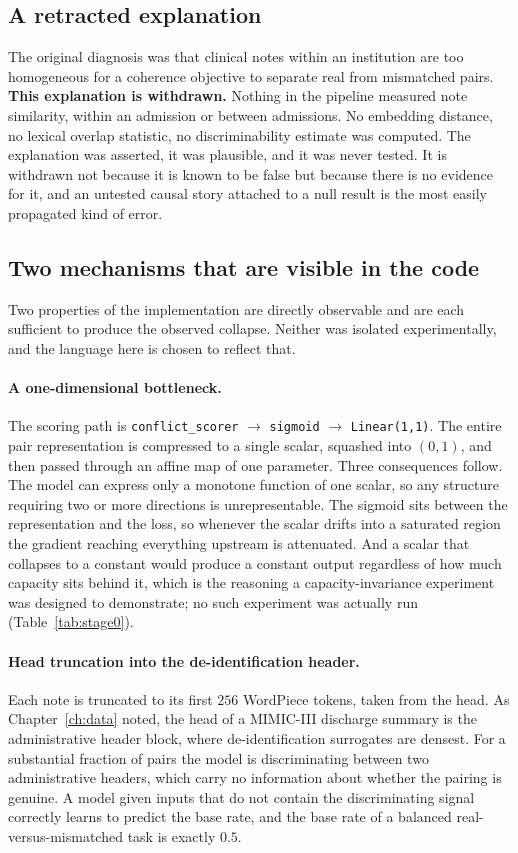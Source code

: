 \subsection{A retracted explanation}

The original diagnosis was that clinical notes within an institution are too
homogeneous for a coherence objective to separate real from mismatched pairs.
\textbf{This explanation is withdrawn.} Nothing in the pipeline measured note
similarity, within an admission or between admissions. No embedding distance, no
lexical overlap statistic, no discriminability estimate was computed. The
explanation was asserted, it was plausible, and it was never tested. It is
withdrawn not because it is known to be false but because there is no evidence
for it, and an untested causal story attached to a null result is the most
easily propagated kind of error.

\subsection{Two mechanisms that are visible in the code}

Two properties of the implementation are directly observable and are each
sufficient to produce the observed collapse. Neither was isolated
experimentally, and the language here is chosen to reflect that.

\paragraph{A one-dimensional bottleneck.} The scoring path is
\texttt{conflict\_scorer} $\rightarrow$ \texttt{sigmoid} $\rightarrow$
\texttt{Linear(1,1)}. The entire pair representation is compressed to a single
scalar, squashed into $(0,1)$, and then passed through an affine map of one
parameter. Three consequences follow. The model can express only a monotone
function of one scalar, so any structure requiring two or more directions is
unrepresentable. The sigmoid sits between the representation and the loss, so
whenever the scalar drifts into a saturated region the gradient reaching
everything upstream is attenuated. And a scalar that collapses to a constant
would produce a constant output regardless of how much capacity sits behind
it, which is the reasoning a capacity-invariance experiment was designed to
demonstrate; no such experiment was actually run (Table~\ref{tab:stage0}).

\paragraph{Head truncation into the de-identification header.} Each note is
truncated to its first $256$ WordPiece tokens, taken from the head. As
Chapter~\ref{ch:data} noted, the head of a MIMIC-III discharge summary is the
administrative header block, where de-identification surrogates are densest. For
a substantial fraction of pairs the model is discriminating between two
administrative headers, which carry no information about whether the pairing is
genuine. A model given inputs that do not contain the discriminating signal
correctly learns to predict the base rate, and the base rate of a balanced
real-versus-mismatched task is exactly $0.5$.

